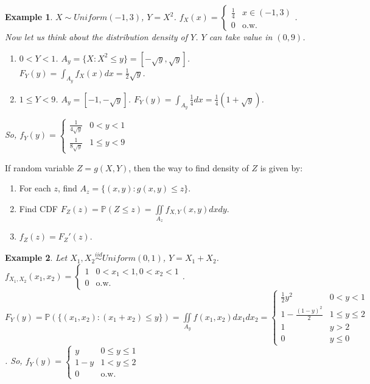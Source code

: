 \documentclass[11pt]{article}
\def\BP{{\bf P}}
\def\BP{{\mathbb P}}
\newtheorem{example}{Example}[section]
\begin{document}
\begin{example}
  $X \sim Uniform(-1, 3)$, $Y=X^2$. $f_X(x) = \begin{cases}\frac{1}{4} & x\in(-1,3) \\ 0 & \text{o.w.}\end{cases}$. Now let us think about the distribution density of $Y$. $Y$ can take value in $(0, 9)$. 
  \begin{enumerate}
    \item $0 < Y < 1$. $A_y = \{X : X^2 \leq y\} = [-\sqrt{y}, \sqrt{y}]$. $F_Y(y) = \int_{A_y} f_X(x) dx = \frac{1}{2} \sqrt{y}$.
    \item $1 \leq Y < 9$. $A_y = [-1, -\sqrt{y}]$. $F_Y(y) = \int_{A_y} \frac{1}{4} dx = \frac{1}{4}(1 + \sqrt{y})$. 
  \end{enumerate}
  So, $f_Y(y) = \begin{cases} \frac{1}{4\sqrt{y}}  & 0 < y < 1 \\ \frac{1}{8\sqrt{y}}  & 1 \leq y < 9\end{cases}$
\end{example}

If random variable $Z = g(X, Y)$, then the way to find density of $Z$ is given by:
\begin{enumerate}
\item For each $z$, find $A_z = \{(x, y): g(x, y)\leq z\}$.
\item Find CDF $F_Z(z) = \BP(Z \leq z) = \iint\limits_{A_z} f_{X,Y}(x, y) dxdy$.
\item $f_Z(z) = F_Z'(z)$.
\end{enumerate}

\begin{example}
  Let $X_1, X_2 \stackrel{iid}{\sim} Uniform(0, 1)$, $Y = X_1 + X_2$. $f_{X_1, X_2}(x_1, x_2) = \begin{cases} 1 & 0<x_1 < 1, 0 < x_2 < 1 \\ 0 & \text{o.w.} \end{cases}$. $F_Y(y) = \BP(\{(x_1, x_2): (x_1 + x_2) \leq y \}) = \iint\limits_{A_y} f(x_1, x_2) dx_1dx_2 = \begin{cases}\frac{1}{2}y^2 & 0<y<1 \\
  1 - \frac{(1-y)^2}{2} & 1 \leq y \leq 2 \\ 1 & y > 2 \\ 0 & y \leq 0 \end{cases}$. So,
  $f_Y(y) = \begin{cases}y & 0\leq y \leq 1 \\ 1 - y & 1 < y \leq 2 \\ 0 & \text{o.w.} \end{cases}$
\end{example}
\end{document}
